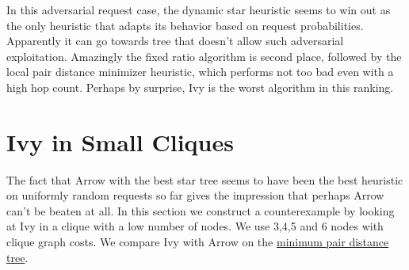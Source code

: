 \documentclass[a4paper, oneside]{discothesis}
\begin{document}

In this adversarial request case, the dynamic star heuristic seems to win out as the only heuristic that adapts its behavior based on request probabilities. Apparently it can go towards tree that doesn't allow such adversarial exploitation. Amazingly the fixed ratio algorithm is second place, followed by the local pair distance minimizer heuristic, which performs not too bad even with a high hop count. Perhaps by surprise, Ivy is the worst algorithm in this ranking.

\section{Ivy in Small Cliques}
\label{result:clique}

The fact that Arrow with the best star tree seems to have been the best heuristic on uniformly random requests so far gives the impression that perhaps Arrow can't be beaten at all. In this section we construct a counterexample by looking at Ivy in a clique with a low number of nodes. We use 3,4,5 and 6 nodes with clique graph costs. We compare Ivy with Arrow on the \hyperref[tree:mpd]{minimum pair distance tree}.
\end{document}
